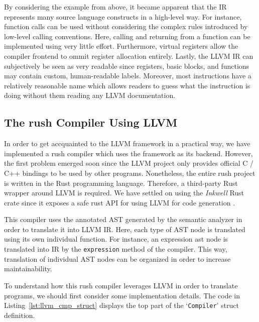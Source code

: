 By considering the example from above, it became apparent that the IR represents many source language constructs in a high-level way.
For instance, function calls can be used without considering the complex rules introduced by low-level calling conventions.
Here, calling and returning from a function can be implemented using very little effort.
Furthermore, virtual registers allow the compiler frontend to ommit register allocation entirely.
Lastly, the LLVM IR can subjectively be seen as very readable since registers, basic blocks, and functions may contain custom, human-readable labels.
Moreover, most instructions have a relatively reasonable name which allows readers to guess what the instruction is doing without them reading any LLVM documentation.


\subsection{The rush Compiler Using LLVM}

In order to get accquainted to the LLVM framework in a practical way, we have implemented a rush compiler which uses the framework as its backend.
However, the first problem emerged soon since the LLVM project only provides official C / C++ bindings to be used by other programs.
Nonetheless, the entire rush project is written in the Rust programming language.
Therefore, a third-party Rust wrapper around LLVM is required.
We have settled on using the \emph{Inkwell} Rust crate since it exposes a safe rust API for using LLVM for code generation \cite{Inkwell2023}.

This compiler uses the annotated AST generated by the semantic analyzer in order to translate it into LLVM IR.
Here, each type of AST node is translated using its own individual function.
For instance, an expression ast node is translated into IR by the \texttt{expression} method of the compiler.
This way, translation of individual AST nodes can be organized in order to increase maintainability. 

To understand how this rush compiler leverages LLVM in order to translate programs, we should first consider some implementation details.
The code in Listing~\ref{lst:llvm_cmp_struct} displays the top part of the `\texttt{Compiler}' struct definition.


